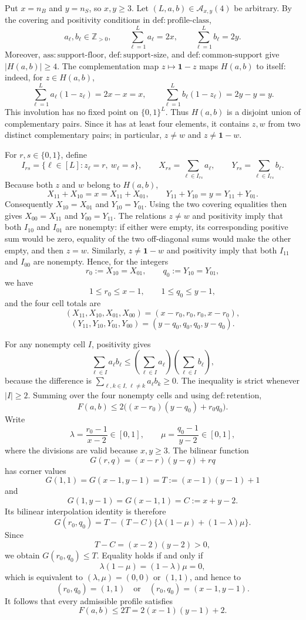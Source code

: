 Put \(x=n_B\) and \(y=n_S\), so \(x,y\ge 3\).  Let \((L,a,b)\in\mathcal A_{x,y}(4)\) be arbitrary.  By the covering and positivity conditions in \(\mathrm{def{:}profile\text{-}class}\),
\[
 a_\ell,b_\ell\in\mathbb Z_{>0},\qquad
 \sum_{\ell=1}^L a_\ell=2x,\qquad
 \sum_{\ell=1}^L b_\ell=2y.
\]
Moreover, \(\mathrm{ass{:}support\text{-}floor}\), \(\mathrm{def{:}support\text{-}size}\), and \(\mathrm{def{:}common\text{-}support}\) give \(|H(a,b)|\ge4\).  The complementation map \(z\mapsto\mathbf 1-z\) maps \(H(a,b)\) to itself: indeed, for \(z\in H(a,b)\),
\[
 \sum_{\ell=1}^L a_\ell(1-z_\ell)=2x-x=x,
 \qquad
 \sum_{\ell=1}^L b_\ell(1-z_\ell)=2y-y=y.
\]
This involution has no fixed point on \(\{0,1\}^L\).  Thus \(H(a,b)\) is a disjoint union of complementary pairs.  Since it has at least four elements, it contains \(z,w\) from two distinct complementary pairs; in particular, \(z\ne w\) and \(z\ne\mathbf 1-w\).

For \(r,s\in\{0,1\}\), define
\[
 I_{rs}=\{\ell\in[L]:z_\ell=r,\ w_\ell=s\},\qquad
 X_{rs}=\sum_{\ell\in I_{rs}}a_\ell,\qquad
 Y_{rs}=\sum_{\ell\in I_{rs}}b_\ell.
\]
Because both \(z\) and \(w\) belong to \(H(a,b)\),
\[
 X_{11}+X_{10}=x=X_{11}+X_{01},
 \qquad
 Y_{11}+Y_{10}=y=Y_{11}+Y_{01}.
\]
Consequently \(X_{10}=X_{01}\) and \(Y_{10}=Y_{01}\).  Using the two covering equalities then gives \(X_{00}=X_{11}\) and \(Y_{00}=Y_{11}\).  The relations \(z\ne w\) and positivity imply that both \(I_{10}\) and \(I_{01}\) are nonempty: if either were empty, its corresponding positive sum would be zero, equality of the two off-diagonal sums would make the other empty, and then \(z=w\).  Similarly, \(z\ne\mathbf 1-w\) and positivity imply that both \(I_{11}\) and \(I_{00}\) are nonempty.  Hence, for the integers
\[
 r_0:=X_{10}=X_{01},\qquad q_0:=Y_{10}=Y_{01},
\]
we have
\[
 1\le r_0\le x-1,\qquad 1\le q_0\le y-1,
\]
and the four cell totals are
\[
 (X_{11},X_{10},X_{01},X_{00})=(x-r_0,r_0,r_0,x-r_0),
\]
\[
 (Y_{11},Y_{10},Y_{01},Y_{00})=(y-q_0,q_0,q_0,y-q_0).
\]

For any nonempty cell \(I\), positivity gives
\[
 \sum_{\ell\in I}a_\ell b_\ell
 \le \left(\sum_{\ell\in I}a_\ell\right)
       \left(\sum_{\ell\in I}b_\ell\right),
\]
because the difference is \(\sum_{\ell,k\in I,\,\ell\ne k}a_\ell b_k\ge0\).  The inequality is strict whenever \(|I|\ge2\).  Summing over the four nonempty cells and using \(\mathrm{def{:}retention}\),
\[
 F(a,b)\le 2\bigl((x-r_0)(y-q_0)+r_0q_0\bigr).
\]
Write
\[
 \lambda=\frac{r_0-1}{x-2}\in[0,1],\qquad
 \mu=\frac{q_0-1}{y-2}\in[0,1],
\]
where the divisions are valid because \(x,y\ge3\).  The bilinear function
\[
 G(r,q)=(x-r)(y-q)+rq
\]
has corner values
\[
 G(1,1)=G(x-1,y-1)=T:=(x-1)(y-1)+1
\]
and
\[
 G(1,y-1)=G(x-1,1)=C:=x+y-2.
\]
Its bilinear interpolation identity is therefore
\[
 G(r_0,q_0)
 =T-(T-C)\{\lambda(1-\mu)+(1-\lambda)\mu\}.
\]
Since
\[
 T-C=(x-2)(y-2)>0,
\]
we obtain \(G(r_0,q_0)\le T\).  Equality holds if and only if
\[
 \lambda(1-\mu)=(1-\lambda)\mu=0,
\]
which is equivalent to \((\lambda,\mu)=(0,0)\) or \((1,1)\), and hence to
\[
 (r_0,q_0)=(1,1)\quad\text{or}\quad(r_0,q_0)=(x-1,y-1).
\]
It follows that every admissible profile satisfies
\[
 F(a,b)\le2T=2(x-1)(y-1)+2.
\]

